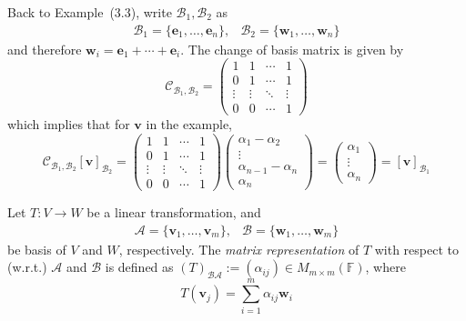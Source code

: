 \begin{example}
Back to Example~(3.3), write $\mathcal{B}_1,\mathcal{B}_2$ as
\[
\begin{array}{ll}
\mathcal{B}_1=\{\bm e_1,\dots,\bm e_n\},
&
\mathcal{B}_2=\{\bm w_1,\dots,\bm w_n\}
\end{array}
\]
and therefore $\bm w_i=\bm e_1+\cdots+\bm e_i$. The change of basis matrix is given by
\[
\mathcal{C}_{\mathcal{B}_1,\mathcal{B}_2}=
\begin{pmatrix}
1&1&\cdots&1\\
0&1&\cdots&1\\
\vdots&\vdots&\ddots&\vdots\\
0&0&\cdots&1
\end{pmatrix}
\]
which implies that for $\bm v$ in the example,
\[
\mathcal{C}_{\mathcal{B}_1,\mathcal{B}_2}[\bm v]_{\mathcal{B}_2}
=
\begin{pmatrix}
1&1&\cdots&1\\
0&1&\cdots&1\\
\vdots&\vdots&\ddots&\vdots\\
0&0&\cdots&1
\end{pmatrix}
\begin{pmatrix}
\alpha_1-\alpha_2\\\vdots\\\alpha_{n-1}-\alpha_n\\\alpha_n
\end{pmatrix}=\begin{pmatrix}
\alpha_1\\\vdots\\\alpha_n
\end{pmatrix}=[\bm v]_{\mathcal{B}_1}
\]
\end{example}

\begin{definition}
Let $T:V\to W$ be a linear transformation, and 
\[
\begin{array}{ll}
\mathcal{A}=\{\bm v_1,\dots,\bm v_m\},
&
\mathcal{B}=\{\bm w_1,\dots,\bm w_m\}
\end{array}
\]
be basis of $V$ and $W$, respectively. 
The \emph{matrix representation} of $T$ with respect to (w.r.t.) $\mathcal{A}$ and $\mathcal{B}$ is
defined as $(T)_{\mathcal{B}\mathcal{A}}:=(\alpha_{ij})\in M_{m\times m}(\mathbb{F})$, where
\[
T(\bm v_j)=\sum_{i=1}^m\alpha_{ij}\bm w_i
\]
\end{definition}












